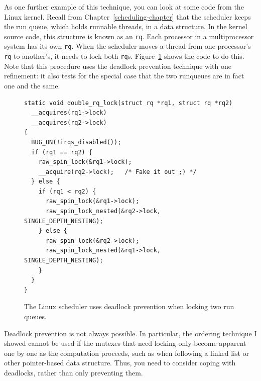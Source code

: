 As one further example of this technique, you can look at some code
from the Linux kernel.  Recall from Chapter~\ref{scheduling-chapter} that the scheduler keeps the run queue,
which holds runnable
threads, in a data structure.  In the kernel
source code, this structure is
known as an \texttt{rq}.  Each processor in a multiprocessor system has
its own \texttt{rq}.  When the scheduler moves a thread from one processor's
\texttt{rq} to another's, it needs to lock both \texttt{rq}s.
Figure~\ref{double_rq_lock} shows the code to
do this.  Note that this
procedure uses the deadlock prevention technique with one refinement:
it also tests for the special case that the two runqueues are
in fact one and the same.
\begin{figure}
\begin{verbatim}
static void double_rq_lock(struct rq *rq1, struct rq *rq2)
  __acquires(rq1->lock)
  __acquires(rq2->lock)
{
  BUG_ON(!irqs_disabled());
  if (rq1 == rq2) {
    raw_spin_lock(&rq1->lock);
    __acquire(rq2->lock);   /* Fake it out ;) */
  } else {
    if (rq1 < rq2) {
      raw_spin_lock(&rq1->lock);
      raw_spin_lock_nested(&rq2->lock, SINGLE_DEPTH_NESTING);
    } else {
      raw_spin_lock(&rq2->lock);
      raw_spin_lock_nested(&rq1->lock, SINGLE_DEPTH_NESTING);
    }
  }
}
\end{verbatim}
\caption{The Linux scheduler uses deadlock prevention when locking two
run queues.}
\label{double_rq_lock}
\end{figure}

Deadlock prevention is not always possible.  In particular, the
ordering technique I showed cannot be used if the mutexes that need
locking only become apparent one by one as the computation proceeds,
such as when following a linked list or other pointer-based
data structure.  Thus, you need to consider coping with deadlocks,
rather than only preventing them.

